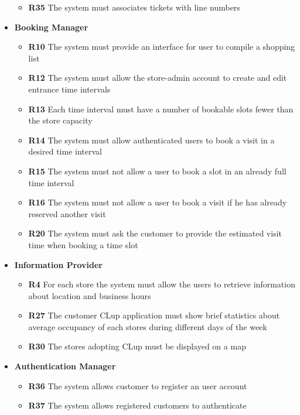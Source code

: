 \begin{itemize}
\begin{itemize}
              \item \textbf{R35} The system must associates tickets with line numbers
          \end{itemize}
    \item \colorbox{clup_red}{\textbf{Booking Manager}}
          \begin{itemize}
              \item \textbf{R10} The system must provide an interface for user to compile a shopping list
              \item \textbf{R12} The system must allow the store-admin account to create and edit entrance time intervals
              \item \textbf{R13} Each time interval must have a number of bookable slots fewer than the store capacity
              \item \textbf{R14} The system must allow authenticated users to book a visit in a desired time interval
              \item \textbf{R15} The system must not allow a user to book a slot in an already full time interval
              \item \textbf{R16} The system must not allow a user to book a visit if he has already reserved another visit
              \item \textbf{R20} The system must ask the customer to provide the estimated visit time when booking a time slot
          \end{itemize}
    \item \colorbox{clup_red}{\textbf{Information Provider}}
          \begin{itemize}
              \item \textbf{R4} For each store the system must allow the users to retrieve information about location and business hours
              \item \textbf{R27} The customer CLup application must show brief statistics about average occupancy of each stores during different days of the week
              \item \textbf{R30} The stores adopting CLup must be displayed on a map
          \end{itemize}
    \item \colorbox{clup_red}{\textbf{Authentication Manager}}
          \begin{itemize}
              \item \textbf{R36} The system allows customer to register an user account
              \item \textbf{R37} The system allows registered customers to authenticate

\end{itemize}
\end{itemize}

